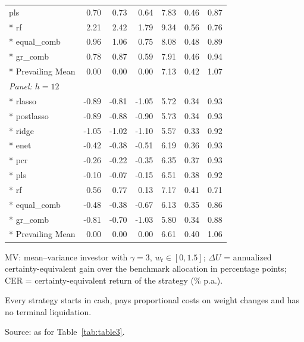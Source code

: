\begin{longtable}{lrrrrrr}
pls & 0.70 & 0.73 & 0.64 & 7.83 & 0.46 & 0.87 \\*
rf & 2.21 & 2.42 & 1.79 & 9.34 & 0.56 & 0.76 \\*
equal\_comb & 0.96 & 1.06 & 0.75 & 8.08 & 0.48 & 0.89 \\*
gr\_comb & 0.78 & 0.87 & 0.59 & 7.91 & 0.46 & 0.94 \\*
Prevailing Mean & 0.00 & 0.00 & 0.00 & 7.13 & 0.42 & 1.07 \\
\multicolumn{7}{l}{\emph{Panel: $h=12$}} \\*
rlasso & -0.89 & -0.81 & -1.05 & 5.72 & 0.34 & 0.93 \\*
postlasso & -0.89 & -0.88 & -0.90 & 5.73 & 0.34 & 0.93 \\*
ridge & -1.05 & -1.02 & -1.10 & 5.57 & 0.33 & 0.92 \\*
enet & -0.42 & -0.38 & -0.51 & 6.19 & 0.36 & 0.93 \\*
pcr & -0.26 & -0.22 & -0.35 & 6.35 & 0.37 & 0.93 \\*
pls & -0.10 & -0.07 & -0.15 & 6.51 & 0.38 & 0.92 \\*
rf & 0.56 & 0.77 & 0.13 & 7.17 & 0.41 & 0.71 \\*
equal\_comb & -0.48 & -0.38 & -0.67 & 6.13 & 0.35 & 0.86 \\*
gr\_comb & -0.81 & -0.70 & -1.03 & 5.80 & 0.34 & 0.88 \\*
Prevailing Mean & 0.00 & 0.00 & 0.00 & 6.61 & 0.40 & 1.06 \\
\end{longtable}
\endgroup
\begin{list}{}{\setlength{\leftmargin}{0pt}\setlength{\itemsep}{0pt}\setlength{\topsep}{0pt}}
\item MV: mean--variance investor with $\gamma=3$, $w_t\in[0,1.5]$; $\Delta U$ = annualized certainty-equivalent gain over the benchmark allocation in percentage points; CER = certainty-equivalent return of the strategy (\% p.a.).
\item Every strategy starts in cash, pays proportional costs on weight changes and has no terminal liquidation.
\item Source: as for Table~\ref{tab:table3}.
\end{list}
\medskip

